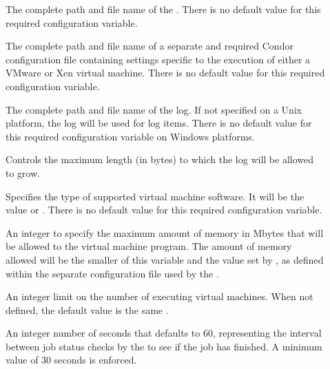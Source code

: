 \begin{description}
\item[]
  \label{param:VMGAHPServer}
  The complete path and file name of the .
  There is no default value for this required configuration variable.

\item[]
  \label{param:VMGAHPConfig}
  The complete path and file name of a separate and required
  Condor configuration file containing settings specific
  to the execution of either a VMware or Xen virtual machine.
  There is no default value for this required configuration variable.

\item[]
  \label{param:VMGAHPLog}
  The complete path and file name of the  log.
  If not specified on a Unix platform, the 
  log will be used for  log items. 
  There is no default value for this required configuration variable
  on Windows platforms.

\item[]
  \label{param:MaxVMGAHPLog}
  Controls the maximum length (in bytes) to which the  log
  will be allowed to grow.

\item[]
  \label{param:VMType}
  Specifies the type of supported virtual machine software.
  It will be the value \verb@xen@ or \verb@vmware@.
  There is no default value for this required configuration variable.

\item[]
  \label{param:VMMaxMemory}
  An integer to specify the maximum amount of memory in Mbytes
  that will be allowed to the virtual machine program.
  The amount of memory allowed will be the smaller of this
  variable and the value set by , as defined within
  the separate configuration file used by the .

\item[]
  \label{param:VMMaxNumber}
  An integer limit on the number of executing virtual machines.
  When not defined, the default value is the same .

\item[]
  \label{param:VMStatusInterval}
  An integer number of seconds that defaults to 60,
  representing the interval between job status checks by the
   to see if the job has finished.
  A minimum value of 30 seconds is enforced.


\end{description}
